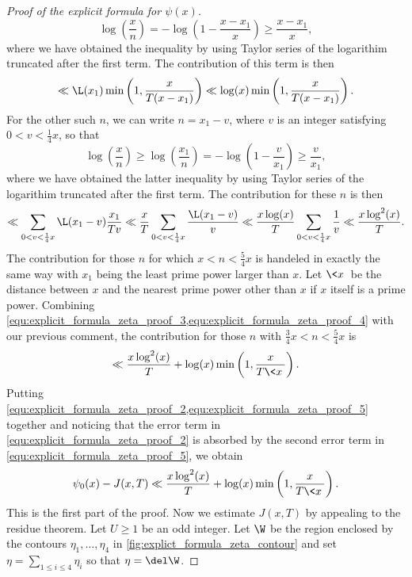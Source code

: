 \begin{proof}[Proof of the explicit formula for $\psi(x)$]
        \[
          \log\left(\frac{x}{n}\right) = -\log\left(1-\frac{x-x_{1}}{x}\right) \ge \frac{x-x_{1}}{x},
        \]
        where we have obtained the inequality by using Taylor series of the logarithim truncated after the first term. The contribution of this term is then
        \begin{equation}\label{equ:explicit_formula_zeta_proof_3}
          \ll \L(x_{1})\min\left(1,\frac{x}{T(x-x_{1})}\right) \ll \log(x)\min\left(1,\frac{x}{T(x-x_{1})}\right).
        \end{equation}
        For the other such $n$, we can write $n = x_{1}-v$, where $v$ is an integer satisfying $0 < v < \frac{1}{4}x$, so that
        \[
          \log\left(\frac{x}{n}\right) \ge \log\left(\frac{x_{1}}{n}\right) = -\log\left(1-\frac{v}{x_{1}}\right) \ge \frac{v}{x_{1}},
        \]
        where we have obtained the latter inequality by using Taylor series of the logarithim truncated after the first term. The contribution for these $n$ is then
        \begin{equation}\label{equ:explicit_formula_zeta_proof_4}
          \ll \sum_{0 < v < \frac{1}{4}x}\L(x_{1}-v)\frac{x_{1}}{Tv} \ll \frac{x}{T}\sum_{0 < v < \frac{1}{4}x}\frac{\L(x_{1}-v)}{v} \ll \frac{x\log(x)}{T}\sum_{0 < v < \frac{1}{4}x}\frac{1}{v} \ll \frac{x\log^{2}(x)}{T}.
        \end{equation}
        The contribution for those $n$ for which $x < n < \frac{5}{4}x$ is handeled in exactly the same way with $x_{1}$ being the least prime power larger than $x$. Let $\<x\>$ be the distance between $x$ and the nearest prime power other than $x$ if $x$ itself is a prime power. Combining \cref{equ:explicit_formula_zeta_proof_3,equ:explicit_formula_zeta_proof_4} with our previous comment, the contribution for those $n$ with $\frac{3}{4}x < n < \frac{5}{4}x$ is
        \begin{equation}\label{equ:explicit_formula_zeta_proof_5}
          \ll \frac{x\log^{2}(x)}{T}+\log(x)\min\left(1,\frac{x}{T\<x\>}\right).
        \end{equation}
        Putting \cref{equ:explicit_formula_zeta_proof_2,equ:explicit_formula_zeta_proof_5} together and noticing that the error term in \cref{equ:explicit_formula_zeta_proof_2} is absorbed by the second error term in \cref{equ:explicit_formula_zeta_proof_5}, we obtain
        \begin{equation}\label{equ:explicit_formula_zeta_proof_6}
          \psi_{0}(x)-J(x,T) \ll \frac{x\log^{2}(x)}{T}+\log(x)\min\left(1,\frac{x}{T\<x\>}\right).
        \end{equation}
        This is the first part of the proof. Now we estimate $J(x,T)$ by appealing to the residue theorem. Let $U \ge 1$ be an odd integer. Let $\W$ be the region enclosed by the contours $\eta_{1},\ldots,\eta_{4}$ in \cref{fig:explict_formula_zeta_contour} and set $\eta = \sum_{1 \le i \le 4}\eta_{i}$ so that $\eta = \del \W$.


\end{proof}
